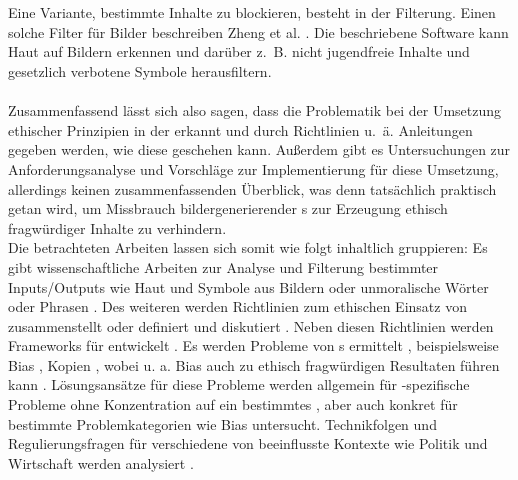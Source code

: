 \\\\
Eine Variante, bestimmte Inhalte zu blockieren, besteht in der Filterung. Einen solche Filter für Bilder beschreiben Zheng et al. \cite{Zheng}. Die beschriebene Software kann Haut auf Bildern erkennen und darüber z. B. nicht jugendfreie Inhalte und gesetzlich verbotene Symbole herausfiltern. 
\\\\
Zusammenfassend lässt sich also sagen, dass die Problematik bei der Umsetzung ethischer Prinzipien in der  erkannt und durch Richtlinien u. ä. Anleitungen gegeben werden, wie diese geschehen kann. Außerdem gibt es Untersuchungen zur Anforderungsanalyse und Vorschläge zur Implementierung für diese Umsetzung, allerdings keinen zusammenfassenden Überblick, was denn tatsächlich praktisch getan wird, um Missbrauch bildergenerierender s zur Erzeugung ethisch fragwürdiger Inhalte zu verhindern. \\
\newpage 
Die betrachteten Arbeiten lassen sich somit wie folgt inhaltlich gruppieren: Es gibt wissenschaftliche Arbeiten zur Analyse und Filterung bestimmter Inputs/Outputs wie Haut und Symbole aus Bildern \cite{Zheng} oder unmoralische Wörter oder Phrasen \cite{Shah}. Des weiteren werden Richtlinien zum ethischen Einsatz von  zusammenstellt oder definiert und diskutiert \cite{Ayling} \cite{Srinivasan} \cite{Jameel} \cite{Hagendorff} \cite{Jobin} \cite{Unity} \cite{EUCommision} \cite{Mueller}. Neben diesen Richtlinien werden Frameworks für  entwickelt \cite{Huang} \cite{Mueller}. Es werden Probleme von s ermittelt \cite{Ayling}, beispielsweise Bias \cite{Salminen} \cite{Jameel}, Kopien \cite{Somepalli}, wobei u. a. Bias auch zu ethisch fragwürdigen Resultaten führen kann \cite{Zuber}. Lösungsansätze für diese Probleme werden allgemein für -spezifische Probleme ohne Konzentration auf ein bestimmtes \cite{Ayling} \cite{Avelar}, aber auch konkret für bestimmte Problemkategorien wie Bias \cite{Srinivasan} \cite{Jameel} untersucht. Technikfolgen und Regulierungsfragen für verschiedene von  beeinflusste Kontexte wie Politik und Wirtschaft werden analysiert \cite{Pawelec}.